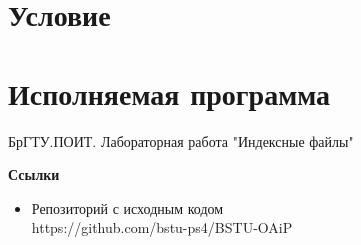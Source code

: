 \documentclass[12pt, a4paper]{article}
\begin{document}
\maketitle
\setcounter{page}{2}

\renewcommand{\contentsname}{Содержание}
\tableofcontents
\newpage

\labheading


\labreport

\section{Условие}


\newpage
\section{Исполняемая программа}



\newpage
\begin{thebibliography}{3}
    \bibitem{}
    БрГТУ.ПОИТ. Лабораторная работа "Индексные файлы"
\end{thebibliography}

\textbf{Ссылки}
\begin{itemize}
    \item Репозиторий с исходным кодом\\
    https://github.com/bstu-ps4/BSTU-OAiP
\end{itemize}
\end{document}
